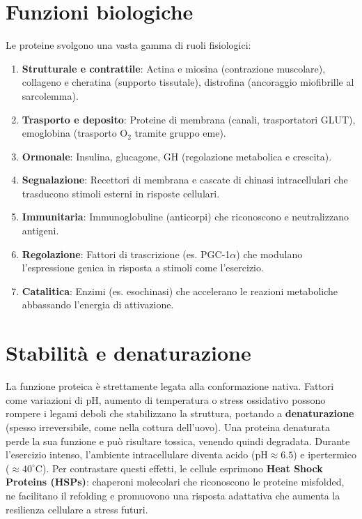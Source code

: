 \documentclass[12pt,a4paper]{report}
\begin{document}
\section{Funzioni biologiche}
Le proteine svolgono una vasta gamma di ruoli fisiologici:
\begin{enumerate}
\item \textbf{Strutturale e contrattile}: Actina e miosina (contrazione muscolare), collageno e cheratina (supporto tissutale), distrofina (ancoraggio miofibrille al sarcolemma).
\item \textbf{Trasporto e deposito}: Proteine di membrana (canali, trasportatori GLUT), emoglobina (trasporto \(\mathrm{O_2}\) tramite gruppo eme).
\item \textbf{Ormonale}: Insulina, glucagone, GH (regolazione metabolica e crescita).
\item \textbf{Segnalazione}: Recettori di membrana e cascate di chinasi intracellulari che trasducono stimoli esterni in risposte cellulari.
\item \textbf{Immunitaria}: Immunoglobuline (anticorpi) che riconoscono e neutralizzano antigeni.
\item \textbf{Regolazione}: Fattori di trascrizione (es. PGC-1\(\alpha\)) che modulano l'espressione genica in risposta a stimoli come l'esercizio.
\item \textbf{Catalitica}: Enzimi (es. esochinasi) che accelerano le reazioni metaboliche abbassando l'energia di attivazione.
\end{enumerate}

\section{Stabilità e denaturazione}
La funzione proteica è strettamente legata alla conformazione nativa. Fattori come variazioni di pH, aumento di temperatura o stress ossidativo possono rompere i legami deboli che stabilizzano la struttura, portando a \textbf{denaturazione} (spesso irreversibile, come nella cottura dell'uovo). Una proteina denaturata perde la sua funzione e può risultare tossica, venendo quindi degradata.
Durante l'esercizio intenso, l'ambiente intracellulare diventa acido (\(\mathrm{pH} \approx 6.5\)) e ipertermico (\(\approx 40^\circ\mathrm{C}\)). Per contrastare questi effetti, le cellule esprimono \textbf{Heat Shock Proteins (HSPs)}: chaperoni molecolari che riconoscono le proteine misfolded, ne facilitano il refolding e promuovono una risposta adattativa che aumenta la resilienza cellulare a stress futuri.
\end{document}
